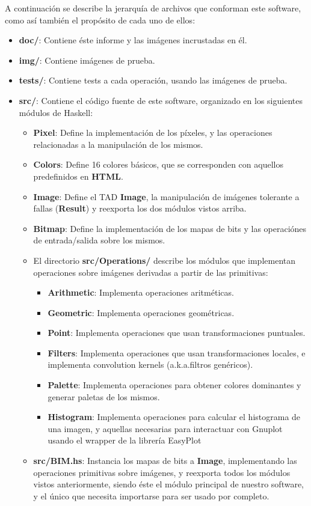 \documentclass[a4paper, 11pt]{article} %
\begin{document}
	A continuación se describe la jerarquía de archivos que conforman este software, como así también el propósito de cada uno de ellos:

	\begin{itemize}
		\item \textbf{doc/}: Contiene éste informe y las imágenes incrustadas en él.
		\item \textbf{img/}: Contiene imágenes de prueba.
		\item \textbf{tests/}: Contiene tests a cada operación, usando las imágenes de prueba.
		\item \textbf{src/}: Contiene el código fuente de este software, organizado en los siguientes módulos de Haskell:
			\begin{itemize}
				\item \textbf{Pixel}: Define la implementación de los píxeles, y las operaciones relacionadas a la manipulación de los mismos.
				\item \textbf{Colors}: Define 16 colores básicos, que se corresponden con aquellos predefinidos en \textbf{HTML}. 
				\item \textbf{Image}: Define el TAD \textbf{Image}, la manipulación de imágenes tolerante a fallas (\textbf{Result}) y reexporta los dos módulos vistos arriba.
				\item \textbf{Bitmap}: Define la implementación de los mapas de bits y las operaciónes de entrada/salida sobre los mismos.
				\item El directorio \textbf{src/Operations/} describe los módulos que implementan operaciones sobre imágenes derivadas a partir de las primitivas:
				\begin{itemize}
					\item \textbf{Arithmetic}: Implementa operaciones aritméticas.
					\item \textbf{Geometric}: Implementa operaciones geométricas.
					\item \textbf{Point}: Implementa operaciones que usan transformaciones puntuales.
					\item \textbf{Filters}: Implementa operaciones que usan transformaciones locales, e implementa convolution kernels (a.k.a.\;filtros genéricos).
					\item \textbf{Palette}: Implementa operaciones para obtener colores dominantes y generar paletas de los mismos.
					\item \textbf{Histogram}: Implementa operaciones para calcular el histograma de una imagen, y aquellas necesarias para interactuar con Gnuplot usando el wrapper de la librería EasyPlot
				\end{itemize}
			\item \textbf{src/BIM.hs}: Instancia los mapas de bits a \textbf{Image}, implementando las operaciones primitivas sobre imágenes, y reexporta todos los módulos vistos anteriormente, siendo éste el módulo principal de nuestro software, y el único que necesita importarse para ser usado por completo.
			\end{itemize}

	\end{itemize}
\end{document}
